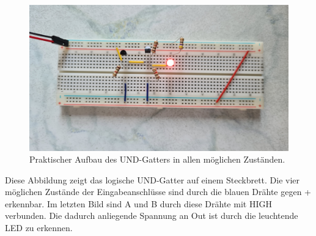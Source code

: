 \begin{figure}[h!]
\begin{minipage}{.5\textwidth}
	\end{minipage}%
	\begin{minipage}{.5\textwidth}
		\centering
		\includegraphics[scale=.05]{./Fotos/UND-11.jpg}
	\end{minipage}
	\caption{Praktischer Aufbau des UND-Gatters in allen möglichen Zuständen.}
\end{figure}
\newpage
Diese Abbildung zeigt das logische UND-Gatter auf einem Steckbrett. Die vier möglichen Zustände der Eingabeanschlüsse sind durch die blauen Drähte gegen \glqq{}+\grqq{} erkennbar. Im letzten Bild sind A und B durch diese Drähte mit HIGH verbunden. Die dadurch anliegende Spannung an Out ist durch die leuchtende LED zu erkennen.

